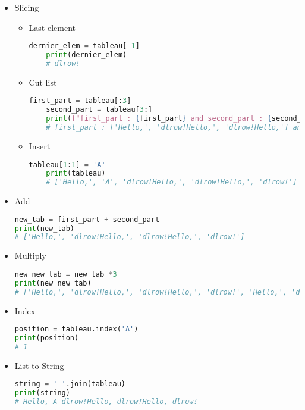 \documentclass[a4paper, 12pt]{article}
\begin{document}
\begin{itemize}
\item Slicing
\begin{itemize}
    \item Last element
    \begin{lstlisting}[language=Python]
    dernier_elem = tableau[-1]
    print(dernier_elem)
    # dlrow!
    \end{lstlisting}
    
    \item Cut list
    \begin{lstlisting}[language=Python]
    first_part = tableau[:3]
    second_part = tableau[3:]
    print(f"first_part : {first_part} and second_part : {second_part}")
    # first_part : ['Hello,', 'dlrow!Hello,', 'dlrow!Hello,'] and second_part : ['dlrow!']
    \end{lstlisting}
    
    \item Insert
    \begin{lstlisting}[language=Python]
    tableau[1:1] = 'A'
    print(tableau)
    # ['Hello,', 'A', 'dlrow!Hello,', 'dlrow!Hello,', 'dlrow!']
    \end{lstlisting}
\end{itemize}

\item Add
\begin{lstlisting}[language=Python]
new_tab = first_part + second_part
print(new_tab)
# ['Hello,', 'dlrow!Hello,', 'dlrow!Hello,', 'dlrow!']
\end{lstlisting}

\item Multiply
\begin{lstlisting}[language=Python]
new_new_tab = new_tab *3
print(new_new_tab)
# ['Hello,', 'dlrow!Hello,', 'dlrow!Hello,', 'dlrow!', 'Hello,', 'dlrow!Hello,', 'dlrow!Hello,', 'dlrow!', 'Hello,', 'dlrow!Hello,', 'dlrow!Hello,', 'dlrow!']
\end{lstlisting}

\item Index
\begin{lstlisting}[language=Python]
position = tableau.index('A')
print(position)
# 1
\end{lstlisting}

\item List to String
\begin{lstlisting}[language=Python]
string = ' '.join(tableau)
print(string)
# Hello, A dlrow!Hello, dlrow!Hello, dlrow!
\end{lstlisting}
\end{itemize}
\end{document}
